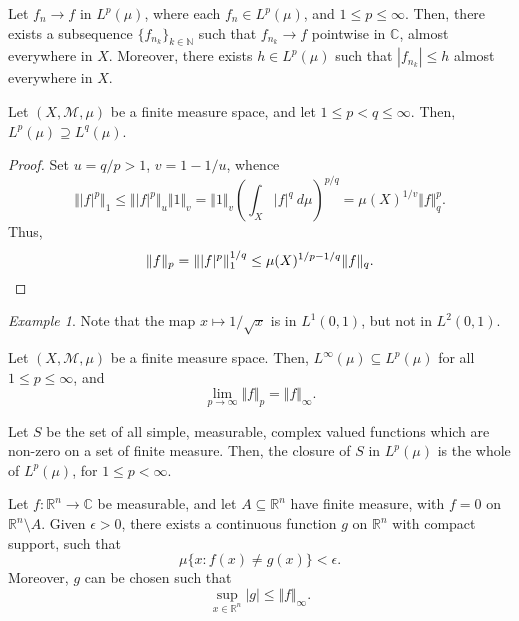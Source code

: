\documentclass[11pt]{article}
\newcommand{\C}{\mathbb{C}}
\newcommand{\R}{\mathbb{R}}
\newcommand{\N}{\mathbb{N}}
\newcommand{\M}{\mathcal{M}}
\newcommand{\norm}[1]{\Vert #1 \Vert}
\theoremstyle{definition}
\theoremstyle{remark}
\newtheorem*{example}{Example}
\numberwithin{equation}{section}
\begin{document}
    \begin{corollary}
        Let $f_n \to f$ in $L^p(\mu)$, where each $f_n \in L^p(\mu)$, and $1 \leq p
        \leq \infty$. Then, there exists a subsequence $\{f_{n_k}\}_{k \in \N}$ such
        that $f_{n_k} \to f$ pointwise in $\C$, almost everywhere in $X$. Moreover,
        there exists $h \in L^p(\mu)$ such that $|f_{n_k}| \leq h$ almost everywhere
        in $X$.
    \end{corollary}

    \begin{theorem}
        Let $(X, \M, \mu)$ be a finite measure space, and let $1 \leq p < q \leq
        \infty$. Then, $L^p(\mu) \supseteq L^q(\mu)$.
    \end{theorem}
    \begin{proof}
        Set $u = q / p > 1$, $v = 1 - 1 / u$, whence \[
            \norm{|f|^p}_1 \leq \norm{|f|^p}_u\norm{1}_v = \norm{1}_v\left(\int_X
            |f|^q\:d\mu\right)^{p / q} = \mu(X)^{1 / v} \norm{f}_q^p.
        \] Thus, \[
            \norm{f}_p = \norm{|f|^p}_1^{1 / q} \leq \mu(X)^{1 / p - 1 /
            q}\norm{f}_q. \qedhere
        \] 
    \end{proof}
    \begin{example}
        Note that the map $x \mapsto 1 / \sqrt{x}$ is in $L^1(0, 1)$, but not in
        $L^2(0, 1)$.
    \end{example}

    \begin{theorem}
        Let $(X, \M, \mu)$ be a finite measure space. Then, $L^\infty(\mu) \subseteq
        L^p(\mu)$ for all $1 \leq p \leq \infty$, and \[
            \lim_{p \to \infty} \norm{f}_p = \norm{f}_\infty.
        \] 
    \end{theorem}

    \begin{theorem}
        Let $S$ be the set of all simple, measurable, complex valued functions which
        are non-zero on a set of finite measure. Then, the closure of $S$ in
        $L^p(\mu)$ is the whole of $L^p(\mu)$, for $1 \leq p < \infty$.
    \end{theorem}
    
    \begin{theorem}[Lusin]
        Let $f\colon \R^n \to \C$ be measurable, and let $A\subseteq \R^n$ have
        finite measure, with $f = 0$ on $\R^n \setminus A$. Given $\epsilon > 0$,
        there exists a continuous function $g$ on $\R^n$ with compact support, such
        that \[
            \mu\{x: f(x) \neq g(x)\} < \epsilon.
        \] Moreover, $g$ can be chosen such that \[
            \sup_{x \in \R^n} |g| \leq \norm{f}_\infty.
        \] 
    \end{theorem}
\end{document}
